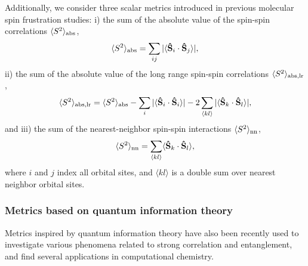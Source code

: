 \documentclass[aip,jcp,amsmath,amssymb, reprint]{revtex4-1}
\begin{document}
Additionally, we consider three scalar metrics introduced in previous molecular spin frustration studies: i) the sum of the absolute value of the spin-spin correlations $\langle S^2 \rangle_{\rm{abs}}$,\cite{Hoyos2014PolyradicalCharacter}
\begin{equation}
\label{eq:S_sq_abs}
\langle S^2 \rangle_{\rm{abs}} = \sum_{ij} |  \langle \mathbf{\hat{S}}_{i} \cdot \mathbf{\hat{S}}_{j} \rangle |,
\end{equation}
ii) the sum of the absolute value of the long range spin-spin correlations $\langle S^2 \rangle_{\rm{abs,lr}}$, 
\begin{equation}
\label{eq:S_sq_abs_lr}
\langle S^2 \rangle_{\rm{abs,lr}} = \langle S^2 \rangle_{\rm{abs}} - \sum_{i} |  \langle \mathbf{\hat{S}}_{i} \cdot \mathbf{\hat{S}}_{i} \rangle | - 2\sum_{\langle kl \rangle} |  \langle \mathbf{\hat{S}}_{k} \cdot \mathbf{\hat{S}}_{l} \rangle |,
\end{equation} 
and iii) the sum of the nearest-neighbor spin-spin interactions $\langle S^2 \rangle_{\rm{nn}}$, 
\begin{equation}
\label{eq:S_sq_nn}
\langle S^2 \rangle_{\rm{nn}} = \sum_{\langle kl \rangle}  \langle \mathbf{\hat{S}}_{k} \cdot \mathbf{\hat{S}}_{l} \rangle,
\end{equation}
where $i$ and $j$ index all orbital sites, and $\langle kl \rangle$ is a double sum over nearest neighbor orbital sites.


\subsubsection{Metrics based on quantum information theory}

Metrics inspired by quantum information theory have also been recently used to investigate various phenomena related to strong correlation and entanglement,\cite{Boguslawski2015OrbtitalEntanglement}
and find several applications in computational chemistry.\cite{Boguslawski2013OrbitalEntanglement,stein2017automated,fertitta2014investigation,Legeza2003OptemizingThe, Rissler2006MeasuringOrbital} 
\end{document}

